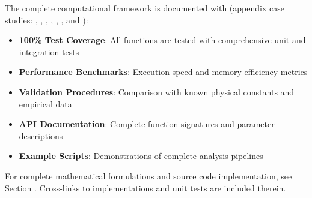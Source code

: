 \documentclass[
  13pt,
  a4paperpaper,
  12pt]{article}
\providecommand{\tightlist}{%
  \setlength{\itemsep}{0pt}\setlength{\parskip}{0pt}}
\begin{document}
The complete computational framework is documented with (appendix case
studies: ,
, ,
, ,
, and ):

\begin{itemize}
\tightlist
\item
  \textbf{100\% Test Coverage}: All functions are tested with
  comprehensive unit and integration tests
\item
  \textbf{Performance Benchmarks}: Execution speed and memory efficiency
  metrics
\item
  \textbf{Validation Procedures}: Comparison with known physical
  constants and empirical data
\item
  \textbf{API Documentation}: Complete function signatures and parameter
  descriptions
\item
  \textbf{Example Scripts}: Demonstrations of complete analysis
  pipelines
\end{itemize}

For complete mathematical formulations and source code implementation,
see Section . Cross-links to
implementations and unit tests are included therein.
\end{document}
